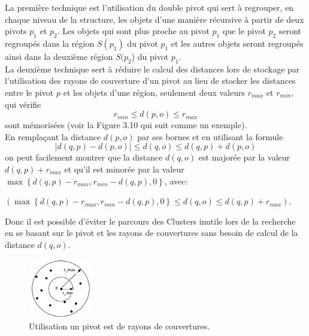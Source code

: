 La première technique est l’utilisation du double pivot qui sert à regrouper, en chaque niveau de la structure, les objets d’une manière récursive à partir de deux pivots $ p_1 $ et $ p_2 $. Les objets qui sont plus proche au pivot $ p_1 $ que le pivot $ p_2 $ seront regroupés dans la région $ S(p_1) $ du pivot $ p_1 $ et les autres objets seront regroupés ainsi dans la deuxième région $ S(p_2 $) du pivot $ p_1 $.\\

La deuxième technique sert à réduire le calcul des distances lors de stockage par l’utilisation des rayons de couverture d’un pivot au lieu de stocker les distances entre le pivot $ p $ et les objets d'une région, seulement deux valeurs $ r_{max} $ et $ r_{min} $, qui vérifie   \begin{displaymath}
	r_{min}  \le d(p,o) \le r_{max}
\end{displaymath}  sont mémorisées (voir la Figure 3.10 qui suit comme un exemple). \\
En remplaçant la distance $ d(p,o) $ par ses bornes et en utilisant la formule  \begin{displaymath}
	|d(q,p)-d(p,o)| \le d(q,o) \le d(q,p)+d(p,o)
\end{displaymath}  on peut facilement montrer que la distance $ d(q,o) $ est majorée par la valeur $ d(q,p) + r_{max} $ et qu’il est minorée par la valeur
$ \max \left\{d(q,p) - r_{max}, r_{min} - d(q,p), 0\right\} $,
avec:
\begin{center}
	$  ( \max \left\{ d(q,p) - r_{max} , r_{min} - d(q,p), 0\right\} \le d(q,o) \le d(q,p) + r_{max} ) $.
\end{center}
 Donc il est possible d’éviter le parcours des Clusters inutile lors de la recherche en se basant sur le pivot et les rayons de couvertures sans besoin de calcul de la distance $ d(q,o) $.
\begin{figure}[H]
	\centering
	\includegraphics[width=0.25\textwidth]{Figures/radius.png} %
	\caption{Utilisation un pivot est de rayons de couvertures.}
\end{figure}


